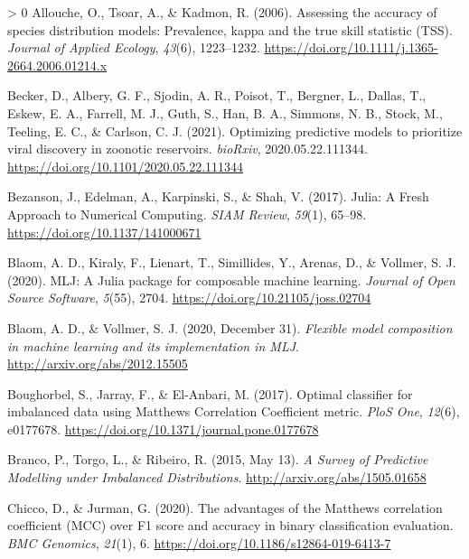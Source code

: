 \documentclass[11pt]{article}
\newlength{\cslhangindent}
\newenvironment{CSLReferences}[3] %
 {%
  \setlength{\parindent}{0pt}
  \ifodd #1 \everypar{\setlength{\hangindent}{\cslhangindent}}\ignorespaces\fi
  \ifnum #2 > 0
  \setlength{\parskip}{#2\baselineskip}
  \fi
 }%
 {}
\begin{document}
\hypertarget{refs}{}
\begin{CSLReferences}{1}{0}
\leavevmode\hypertarget{ref-Allouche2006AssAcc}{}%
Allouche, O., Tsoar, A., \& Kadmon, R. (2006). Assessing the accuracy of
species distribution models: Prevalence, kappa and the true skill
statistic (TSS). \emph{Journal of Applied Ecology}, \emph{43}(6),
1223--1232. \url{https://doi.org/10.1111/j.1365-2664.2006.01214.x}

\leavevmode\hypertarget{ref-Becker2021OptPre}{}%
Becker, D., Albery, G. F., Sjodin, A. R., Poisot, T., Bergner, L.,
Dallas, T., Eskew, E. A., Farrell, M. J., Guth, S., Han, B. A., Simmons,
N. B., Stock, M., Teeling, E. C., \& Carlson, C. J. (2021). Optimizing
predictive models to prioritize viral discovery in zoonotic reservoirs.
\emph{bioRxiv}, 2020.05.22.111344.
\url{https://doi.org/10.1101/2020.05.22.111344}

\leavevmode\hypertarget{ref-Bezanson2017JulFre}{}%
Bezanson, J., Edelman, A., Karpinski, S., \& Shah, V. (2017). Julia: A
Fresh Approach to Numerical Computing. \emph{SIAM Review}, \emph{59}(1),
65--98. \url{https://doi.org/10.1137/141000671}

\leavevmode\hypertarget{ref-Blaom2020MljJul}{}%
Blaom, A. D., Kiraly, F., Lienart, T., Simillides, Y., Arenas, D., \&
Vollmer, S. J. (2020). MLJ: A Julia package for composable machine
learning. \emph{Journal of Open Source Software}, \emph{5}(55), 2704.
\url{https://doi.org/10.21105/joss.02704}

\leavevmode\hypertarget{ref-Blaom2020FleMod}{}%
Blaom, A. D., \& Vollmer, S. J. (2020, December 31). \emph{Flexible
model composition in machine learning and its implementation in MLJ}.
\url{http://arxiv.org/abs/2012.15505}

\leavevmode\hypertarget{ref-Boughorbel2017OptCla}{}%
Boughorbel, S., Jarray, F., \& El-Anbari, M. (2017). Optimal classifier
for imbalanced data using Matthews Correlation Coefficient metric.
\emph{PloS One}, \emph{12}(6), e0177678.
\url{https://doi.org/10.1371/journal.pone.0177678}

\leavevmode\hypertarget{ref-Branco2015SurPre}{}%
Branco, P., Torgo, L., \& Ribeiro, R. (2015, May 13). \emph{A Survey of
Predictive Modelling under Imbalanced Distributions}.
\url{http://arxiv.org/abs/1505.01658}

\leavevmode\hypertarget{ref-Chicco2020AdvMat}{}%
Chicco, D., \& Jurman, G. (2020). The advantages of the Matthews
correlation coefficient (MCC) over F1 score and accuracy in binary
classification evaluation. \emph{BMC Genomics}, \emph{21}(1), 6.
\url{https://doi.org/10.1186/s12864-019-6413-7}


\end{CSLReferences}
\end{document}
